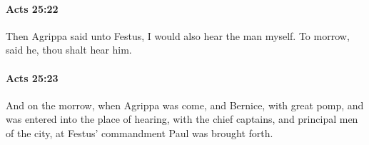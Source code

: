 		\paragraph{Acts 25:22} %
			\label{ACTS-25-22}

			Then Agrippa said unto Festus, I would also hear the man myself.  To morrow, said he, thou shalt hear him.

			\begin{framed}
			\scriptsize
				\begin{compactdesc}
					\item[SBLG] 
				\end{compactdesc}
			\end{framed}

		\paragraph{Acts 25:23} %
			\label{ACTS-25-23}

			And on the morrow, when Agrippa was come, and Bernice, with great pomp, and was entered into the place of hearing, with the chief captains, and principal men of the city, at Festus' commandment Paul was brought forth.

